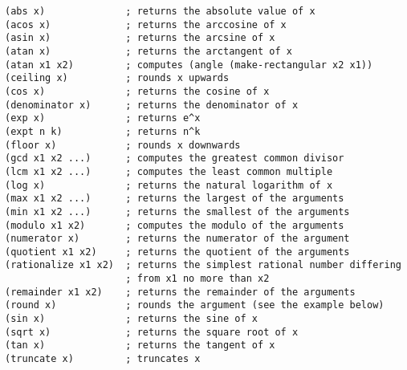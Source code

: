 \documentclass[twocolumn]{article}
\begin{document}
\begin{lstlisting}
(abs x)              ; returns the absolute value of x
(acos x)             ; returns the arccosine of x
(asin x)             ; returns the arcsine of x
(atan x)             ; returns the arctangent of x
(atan x1 x2)         ; computes (angle (make-rectangular x2 x1))
(ceiling x)          ; rounds x upwards
(cos x)              ; returns the cosine of x
(denominator x)      ; returns the denominator of x
(exp x)              ; returns e^x
(expt n k)           ; returns n^k
(floor x)            ; rounds x downwards
(gcd x1 x2 ...)      ; computes the greatest common divisor
(lcm x1 x2 ...)      ; computes the least common multiple
(log x)              ; returns the natural logarithm of x
(max x1 x2 ...)      ; returns the largest of the arguments
(min x1 x2 ...)      ; returns the smallest of the arguments
(modulo x1 x2)       ; computes the modulo of the arguments
(numerator x)        ; returns the numerator of the argument
(quotient x1 x2)     ; returns the quotient of the arguments
(rationalize x1 x2)  ; returns the simplest rational number differing
                     ; from x1 no more than x2
(remainder x1 x2)    ; returns the remainder of the arguments
(round x)            ; rounds the argument (see the example below)
(sin x)              ; returns the sine of x
(sqrt x)             ; returns the square root of x
(tan x)              ; returns the tangent of x
(truncate x)         ; truncates x
\end{lstlisting}
\end{document}
